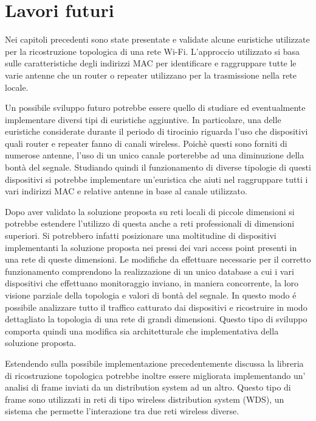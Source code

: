 \chapter{Lavori futuri}

Nei capitoli precedenti sono state presentate e validate alcune euristiche utilizzate per la ricostruzione topologica di una rete Wi-Fi.
L'approccio utilizzato si basa sulle caratteristiche degli indirizzi MAC per identificare e raggruppare tutte le varie antenne che un router o repeater utilizzano per la trasmissione nella rete locale.

Un possibile sviluppo futuro potrebbe essere quello di studiare ed eventualmente implementare diversi tipi di euristiche aggiuntive.
In particolare, una delle euristiche considerate durante il periodo di tirocinio riguarda l'uso che dispositivi quali router e repeater fanno di canali wireless.
Poich\`e questi sono forniti di numerose antenne, l'uso di un unico canale porterebbe ad una diminuzione della bont\`a del segnale.
Studiando quindi il funzionamento di diverse tipologie di questi dispositivi si potrebbe implementare un'euristica che aiuti nel raggruppare tutti i vari indirizzi MAC e relative antenne in base al canale utilizzato.

Dopo aver validato la soluzione proposta su reti locali di piccole dimensioni si potrebbe estendere l'utilizzo di questa anche a reti professionali di dimensioni superiori.
Si potrebbero infatti posizionare una moltitudine di dispositivi implementanti la soluzione proposta nei pressi dei vari access point presenti in una rete di queste dimensioni.
Le modifiche da effettuare necessarie per il corretto funzionamento comprendono la realizzazione di un unico database a cui i vari dispositivi che effettuano monitoraggio  inviano, in maniera concorrente, la loro visione parziale della topologia e valori di bont\`a del segnale.
In questo modo \'e possibile analizzare tutto il traffico catturato dai dispositivi e ricostruire in modo dettagliato la topologia di una rete di grandi dimensioni.
Questo tipo di sviluppo comporta quindi una modifica sia architetturale che implementativa della soluzione proposta.

Estendendo sulla possibile implementazione precedentemente discussa la libreria di ricostruzione topologica potrebbe inoltre essere migliorata implementando un' analisi di frame inviati da un distribution system ad un altro.
Questo tipo di frame sono utilizzati in reti di tipo wireless distribution system (WDS), un sistema che permette l'interazione tra due reti wireless diverse.

